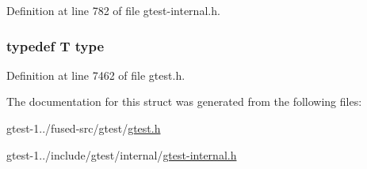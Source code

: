 \-Definition at line 782 of file gtest-\/internal.\-h.

\hypertarget{structtesting_1_1internal_1_1RemoveReference_3_01T_01_6_01_4_a565429e62c1d4fd084335146ba778e17}{
\subsubsection[{type}]{\setlength{\rightskip}{0pt plus 5cm}typedef \-T {\bf type}}}\label{d1/d78/structtesting_1_1internal_1_1RemoveReference_3_01T_01_6_01_4_a565429e62c1d4fd084335146ba778e17}


\-Definition at line 7462 of file gtest.\-h.



\-The documentation for this struct was generated from the following files\-:\begin{DoxyCompactItemize}
\item 
gtest-\/1../fused-\/src/gtest/\hyperlink{fused-src_2gtest_2gtest_8h}{gtest.\-h}\item 
gtest-\/1../include/gtest/internal/\hyperlink{gtest-internal_8h}{gtest-\/internal.\-h}\end{DoxyCompactItemize}
